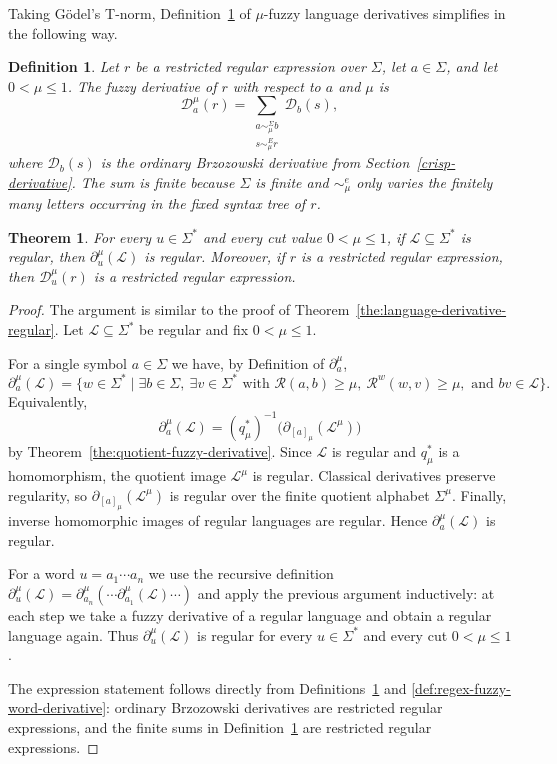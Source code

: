 \documentclass{article}
\newcommand{\cR}{{\mathcal R}}
\def\cut{\mu}
\newtheorem{definition}{Definition}[section]
\newtheorem{theorem}{Theorem}[section]
\begin{document}
Taking G\"odel's T-norm,  Definition~\ref{def:regex-fuzzy-derivative} of $\mu$-fuzzy language derivatives simplifies in the following way.

\begin{definition}\label{def:regex-fuzzy-derivative}
Let $r$ be a restricted regular expression over $\Sigma$, let $a\in\Sigma$, and let
$0<\cut\le 1$. The \emph{fuzzy derivative} of $r$ with respect to $a$ and
$\cut$ is
\[
  \mathcal D_a^\cut(r)
  =
  \sum\limits_{\substack{a\sim_\cut^\Sigma b\\ s\sim_\cut^E r}}
  \mathcal D_b(s),
\]
where $\mathcal D_b(s)$ is the ordinary Brzozowski derivative from
Section~\ref{crisp-derivative}. The sum is finite because $\Sigma$ is finite
and $\sim_\cut^e$ only varies the finitely many letters occurring in the fixed
syntax tree of $r$.
\end{definition}

\begin{theorem}\label{the:language-fuzzy-derivative-regular}
For every $u\in\Sigma^*$ and every cut value $0 < \cut \le 1$, if
$\mathcal{L} \subseteq \Sigma^*$ is regular, then
$\partial^\cut_u(\mathcal{L})$ is regular. Moreover, if $r$ is a
restricted regular expression, then $\mathcal D_u^\cut(r)$ is a restricted
regular expression.
\end{theorem}

\begin{proof}
The argument is similar to the proof of Theorem~\ref{the:language-derivative-regular}.
Let $\mathcal{L} \subseteq \Sigma^*$ be regular and fix $0 < \cut \le 1$.

For a single symbol $a \in \Sigma$ we have, by Definition of $\partial_a^\cut$,
\[
  \partial_a^\cut(\mathcal{L})
  =
  \{ w \in \Sigma^* \mid
    \exists b\in\Sigma,\ \exists v\in\Sigma^*
    \text{ with } \cR(a,b)\ge\cut,\ \mathcal R^w(w,v)\ge\cut,
    \text{ and } bv\in\mathcal L \}.
\]
Equivalently,
\[
  \partial_a^\cut(\mathcal L)
  =
  (q_\cut^*)^{-1}
  \bigl(\partial_{[a]_\cut}(\mathcal L^\cut)\bigr)
\]
by Theorem~\ref{the:quotient-fuzzy-derivative}. Since $\mathcal L$ is regular
and $q_\cut^*$ is a homomorphism, the quotient image $\mathcal L^\cut$ is
regular. Classical derivatives preserve regularity, so
$\partial_{[a]_\cut}(\mathcal L^\cut)$ is regular over the finite quotient
alphabet $\Sigma^\cut$. Finally, inverse homomorphic images of regular languages
are regular. Hence $\partial_a^\cut(\mathcal L)$ is regular.

For a word $u = a_1 \cdots a_n$ we use the recursive definition
$\partial_u^\cut(\mathcal{L}) = \partial_{a_n}^\cut(\cdots \partial_{a_1}^\cut(\mathcal{L}) \cdots)$
and apply the previous argument inductively: at each step we take a fuzzy
derivative of a regular language and obtain a regular language again. Thus
$\partial_u^\cut(\mathcal{L})$ is regular for every $u \in \Sigma^*$ and every
cut $0 < \cut \le 1$.

The expression statement follows directly from
Definitions~\ref{def:regex-fuzzy-derivative} and
\ref{def:regex-fuzzy-word-derivative}: ordinary Brzozowski derivatives are
restricted regular expressions, and the finite sums in
Definition~\ref{def:regex-fuzzy-derivative} are restricted regular expressions.
\end{proof}
\end{document}
